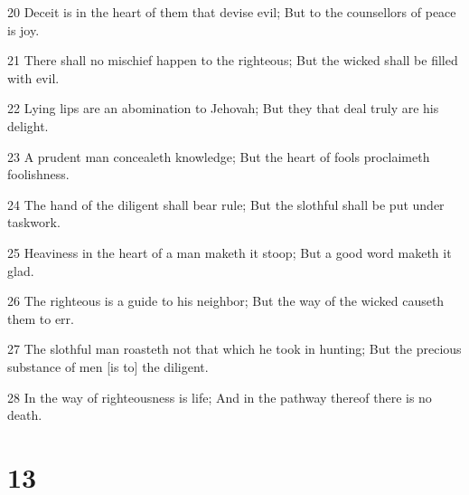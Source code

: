 \par 20 Deceit is in the heart of them that devise evil; But to the counsellors of peace is joy.
\par 21 There shall no mischief happen to the righteous; But the wicked shall be filled with evil.
\par 22 Lying lips are an abomination to Jehovah; But they that deal truly are his delight.
\par 23 A prudent man concealeth knowledge; But the heart of fools proclaimeth foolishness.
\par 24 The hand of the diligent shall bear rule; But the slothful shall be put under taskwork.
\par 25 Heaviness in the heart of a man maketh it stoop; But a good word maketh it glad.
\par 26 The righteous is a guide to his neighbor; But the way of the wicked causeth them to err.
\par 27 The slothful man roasteth not that which he took in hunting; But the precious substance of men [is to] the diligent.
\par 28 In the way of righteousness is life; And in the pathway thereof there is no death.

\chapter{13}

